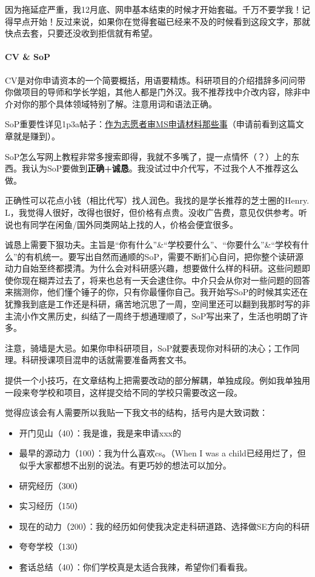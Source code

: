 因为拖延症严重，我12月底、网申基本结束的时候才开始套磁。千万不要学我！记得早点开始！反过来说，如果你在觉得套磁已经来不及的时候看到这段文字，那就快点去套，只要还没收到拒信就有希望。

\paragraph{CV \& SoP}

CV是对你申请资本的一个简要概括，用语要精炼。科研项目的介绍措辞多问问带你做项目的导师和学长学姐，其他人都是门外汉。我不推荐找中介改内容，除非中介对你的那个具体领域特别了解。注意用词和语法正确。

SoP重要性详见1p3a帖子：\href{https://www.1point3acres.com/bbs/thread-581428-1-1.html}{作为志愿者审MS申请材料那些事}（申请前看到这篇文章就是赚到）。

SoP怎么写网上教程非常多搜索即得，我就不多嘴了，提一点情怀（？）上的东西。我认为SoP要做到{\bf{正确+诚恳}}。我没试过中介代写，不过我个人不推荐这么做。

正确性可以花点小钱（相比代写）找人润色。我找的是学长推荐的芝士圈的Henry. L，我觉得人很好，改得也很好，但价格有点贵。没收广告费，意见仅供参考。听说也有同学在闲鱼/国外同类网站上找的人，价格会便宜很多。

诚恳上需要下狠功夫。主旨是“你有什么”\&“学校要什么”、“你要什么”\&“学校有什么”的有机统一。要写出自然而通顺的SoP，需要不断扪心自问，把你整个读研源动力自始至终都摸清。为什么会对科研感兴趣，想要做什么样的科研。这些问题即使你现在糊弄过去了，将来也总有一天会逮住你。中介只会从你对一些问题的回答来揣测你，他们懂个锤子的你，只有你最懂你自己。我开始写SoP的时候其实还在犹豫我到底是工作还是科研，痛苦地沉思了一周，空间里还可以翻到我那时写的非主流小作文黑历史，纠结了一周终于想通理顺了，SoP写出来了，生活也明朗了许多。

注意，骑墙是大忌。如果你申科研项目，SoP就要表现你对科研的决心；工作同理。科研授课项目混申的话就需要准备两套文书。

提供一个小技巧，在文章结构上把需要改动的部分解耦，单独成段。例如我单独用一段来夸学校和项目，这样提交给不同的学校只需要改这一段。

觉得应该会有人需要所以我贴一下我文书的结构，括号内是大致词数：
\begin{itemize}
    \item 开门见山（40）：我是谁，我是来申请xxx的
    \item 最早的源动力（100）：我为什么喜欢cs。（When I was a child已经用烂了，但似乎大家都想不出别的说法。有更巧妙的想法可以加分。
    \item 研究经历（300）
    \item 实习经历（150）
    \item 现在的动力（200）：我的经历如何使我决定走科研道路、选择做SE方向的科研
    \item 夸夸学校（130）
    \item 套话总结（40）：你们学校真是太适合我辣，希望你们看看我。
\end{itemize}



